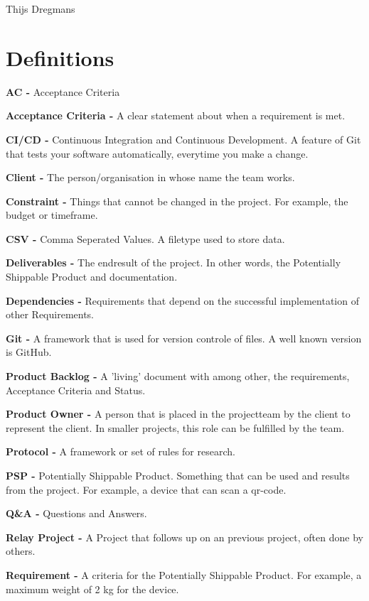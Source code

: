 \documentclass[10pt]{report}
\begin{document}
\bigskip

Thijs Dregmans


\chapter{Definitions}
\thispagestyle{fancy}

\textbf{AC -} Acceptance Criteria

\textbf{Acceptance Criteria -} A clear statement about when a requirement is met. 

\textbf{CI/CD -} Continuous Integration and Continuous Development. A feature of Git that tests your software automatically, everytime you make a change.

\textbf{Client -} The person/organisation in whose name the team works.

\textbf{Constraint -} Things that cannot be changed in the project. For example, the budget or timeframe.

\textbf{CSV -} Comma Seperated Values. A filetype used to store data.

\textbf{Deliverables -} The endresult of the project. In other words, the Potentially Shippable Product and documentation.

\textbf{Dependencies -} Requirements that depend on the successful implementation of other Requirements.

\textbf{Git -} A framework that is used for version controle of files. A well known version is GitHub.

\textbf{Product Backlog -} A 'living' document with among other, the requirements, Acceptance Criteria and Status.

\textbf{Product Owner -} A person that is placed in the projectteam by the client to represent the client. In smaller projects, this role can be fulfilled by the team.

\textbf{Protocol -} A framework or set of rules for research.

\textbf{PSP -} Potentially Shippable Product. Something that can be used and results from the project. For example, a device that can scan a qr-code.

\textbf{Q\&A -} Questions and Answers.

\textbf{Relay Project -} A Project that follows up on an previous project, often done by others.

\textbf{Requirement -} A criteria for the Potentially Shippable Product. For example, a maximum weight of 2 kg for the device.
\end{document}
